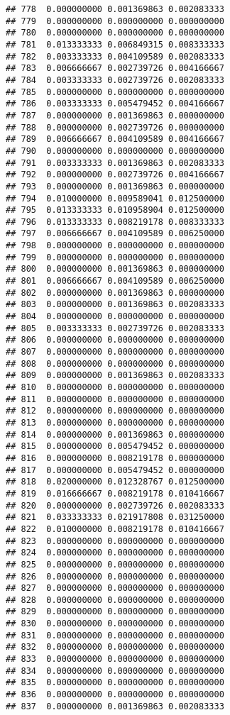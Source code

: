 \documentclass[
]{article}
\begin{document}
\begin{verbatim}
## 778  0.000000000 0.001369863 0.002083333
## 779  0.000000000 0.000000000 0.000000000
## 780  0.000000000 0.000000000 0.000000000
## 781  0.013333333 0.006849315 0.008333333
## 782  0.003333333 0.004109589 0.002083333
## 783  0.006666667 0.002739726 0.004166667
## 784  0.003333333 0.002739726 0.002083333
## 785  0.000000000 0.000000000 0.000000000
## 786  0.003333333 0.005479452 0.004166667
## 787  0.000000000 0.001369863 0.000000000
## 788  0.000000000 0.002739726 0.000000000
## 789  0.006666667 0.004109589 0.004166667
## 790  0.000000000 0.000000000 0.000000000
## 791  0.003333333 0.001369863 0.002083333
## 792  0.000000000 0.002739726 0.004166667
## 793  0.000000000 0.001369863 0.000000000
## 794  0.010000000 0.009589041 0.012500000
## 795  0.013333333 0.010958904 0.012500000
## 796  0.013333333 0.008219178 0.008333333
## 797  0.006666667 0.004109589 0.006250000
## 798  0.000000000 0.000000000 0.000000000
## 799  0.000000000 0.000000000 0.000000000
## 800  0.000000000 0.001369863 0.000000000
## 801  0.006666667 0.004109589 0.006250000
## 802  0.000000000 0.001369863 0.000000000
## 803  0.000000000 0.001369863 0.002083333
## 804  0.000000000 0.000000000 0.000000000
## 805  0.003333333 0.002739726 0.002083333
## 806  0.000000000 0.000000000 0.000000000
## 807  0.000000000 0.000000000 0.000000000
## 808  0.000000000 0.000000000 0.000000000
## 809  0.000000000 0.001369863 0.002083333
## 810  0.000000000 0.000000000 0.000000000
## 811  0.000000000 0.000000000 0.000000000
## 812  0.000000000 0.000000000 0.000000000
## 813  0.000000000 0.000000000 0.000000000
## 814  0.000000000 0.001369863 0.000000000
## 815  0.000000000 0.005479452 0.000000000
## 816  0.000000000 0.008219178 0.000000000
## 817  0.000000000 0.005479452 0.000000000
## 818  0.020000000 0.012328767 0.012500000
## 819  0.016666667 0.008219178 0.010416667
## 820  0.000000000 0.002739726 0.002083333
## 821  0.033333333 0.021917808 0.031250000
## 822  0.010000000 0.008219178 0.010416667
## 823  0.000000000 0.000000000 0.000000000
## 824  0.000000000 0.000000000 0.000000000
## 825  0.000000000 0.000000000 0.000000000
## 826  0.000000000 0.000000000 0.000000000
## 827  0.000000000 0.000000000 0.000000000
## 828  0.000000000 0.000000000 0.000000000
## 829  0.000000000 0.000000000 0.000000000
## 830  0.000000000 0.000000000 0.000000000
## 831  0.000000000 0.000000000 0.000000000
## 832  0.000000000 0.000000000 0.000000000
## 833  0.000000000 0.000000000 0.000000000
## 834  0.000000000 0.000000000 0.000000000
## 835  0.000000000 0.000000000 0.000000000
## 836  0.000000000 0.000000000 0.000000000
## 837  0.000000000 0.001369863 0.002083333

\end{verbatim}
\end{document}
